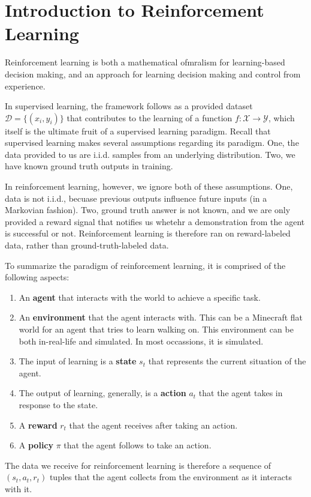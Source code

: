 \section{Introduction to Reinforcement Learning}
Reinforcement learning is both a mathematical ofmralism for learning-based decision making, and an approach for learning decision making and control from experience.

In supervised learning, the framework follows as a provided dataset $\mathcal{D} = \{(x_i, y_i)\}$ that contributes to the learning of a function $f: \mathcal{X} \rightarrow \mathcal{Y}$, which itself is the ultimate fruit of a supervised learning paradigm.
Recall that supervised learning makes several assumptions regarding its paradigm.
One, the data provided to us are i.i.d. samples from an underlying distribution.
Two, we have known ground truth outputs in training.

In reinforcement learning, however, we ignore both of these assumptions.
One, data is not i.i.d., becuase previous outputs influence future inputs (in a Markovian fashion).
Two, ground truth answer is not known, and we are only provided a reward signal that notifies us whetehr a demonstration from the agent is successful or not.
Reinforcement learning is therefore ran on reward-labeled data, rather than ground-truth-labeled data.

To summarize the paradigm of reinforcement learning, it is comprised of the following aspects:
\begin{enumerate}
    \item An \textbf{agent} that interacts with the world to achieve a specific task.
    \item An \textbf{environment} that the agent interacts with. This can be a Minecraft flat world for an agent that tries to learn walking on. This environment can be both in-real-life and simulated. In most occassions, it is simulated.
    \item The input of learning is a \textbf{state} $s_t$ that represents the current situation of the agent.
    \item The output of learning, generally, is a \textbf{action} $a_t$ that the agent takes in response to the state.
    \item A \textbf{reward} $r_t$ that the agent receives after taking an action.
    \item A \textbf{policy} $\pi$ that the agent follows to take an action.
\end{enumerate}
The data we receive for reinforcement learning is therefore a sequence of $(s_t, a_t, r_t)$ tuples that the agent collects from the environment as it interacts with it.

